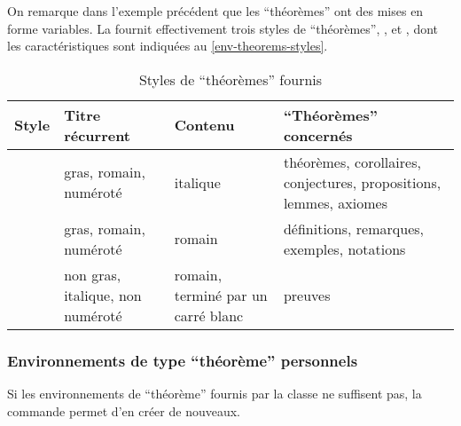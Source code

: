 \documentclass[french,nolocaltoc]{nwejmart}
\newtheorem[title=Fait,style=definition]{fact}
\begin{document}
On remarque dans l'exemple précédent que les \enquote{théorèmes} ont des mises
en forme variables. La \nwejmauthorcl{} fournit effectivement trois styles de
\enquote{théorèmes}, ,  et
, dont les caractéristiques sont indiquées au
\vref{env-theorems-styles}.

\begin{table}
  \centering
  \begin{tabulary}{\linewidth}{LLLL}
Style                 & Titre récurrent                  & Contenu                            & \enquote{Théorèmes} concernés               \\\toprule
{}    & gras, romain, numéroté           & italique
                      & théorèmes, corollaires, conjectures, propositions, lemmes, axiomes                                                  \\\midrule
{} & gras, romain, numéroté           & romain                             & définitions, remarques, exemples, notations \\\midrule
{}      & non gras, italique, non numéroté & romain, terminé par un carré blanc & preuves                                     \\\bottomrule
  \end{tabulary}
  \caption{Styles de \enquote{théorèmes} fournis}
  \label{env-theorems-styles}
\end{table}

\subsubsection{Environnements de type \enquote{théorème} personnels}
\label{sec:envir-de-type-1}

Si les environnements de \enquote{théorème} fournis par la classe ne suffisent
pas, la commande  permet d'en créer de nouveaux.
\end{document}
